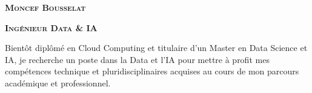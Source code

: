 \documentclass[letterpaper,12t]{article}
\begin{document}

\begin{center}
    \begin{minipage}[c]{0.17\textwidth}
        \centering
        \setlength{\fboxsep}{0.1pt}
        \setlength{\fboxrule}{2pt}
    \end{minipage}
    \hfill
    \begin{minipage}[c]{0.8\textwidth}
        \textbf{\LARGE \scshape Moncef Bousselat}
        \vspace{3pt}
    
        \textbf{\large \scshape Ingénieur Data \& IA}
        \vspace{5pt}

        \begin{minipage}{\textwidth}
            \justifying \small \noindent
            Bientôt diplômé en Cloud Computing et titulaire d'un Master en Data Science et IA, 
            je recherche un poste dans la Data et l'IA pour mettre à profit mes 
            compétences technique et pluridisciplinaires acquises au cours de mon 
            parcours académique et professionnel.
        \end{minipage}


\end{minipage}
\end{center}
\end{document}
